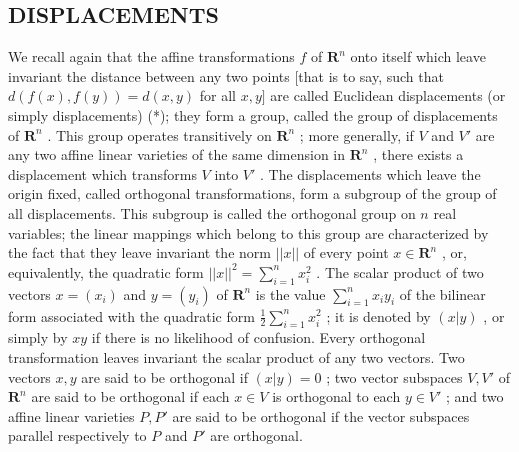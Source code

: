 \subsection{DISPLACEMENTS}

We recall again that the affine transformations \(f\) of \(\mathbf{R}^n\) onto itself which leave invariant the distance between any two points {[}that is to say, such that \(d(f(x), f(y)) = d(x, y)\) for all \(x, y]\) are called Euclidean displacements (or simply displacements) (*); they form a group, called the group of displacements of \(\mathbf{R}^n\) . This group operates transitively on \(\mathbf{R}^n\) ; more generally, if \(V\) and \(V'\) are any two affine linear varieties of the same dimension in \(\mathbf{R}^n\) , there exists a displacement which transforms \(V\) into \(V'\) . The displacements which leave the origin fixed, called orthogonal transformations, form a subgroup of the group of all displacements. This subgroup is called the orthogonal group on \(n\) real variables; the linear mappings which belong to this group are characterized by the fact that they leave invariant the norm \(||x||\) of every point \(x \in \mathbf{R}^n\) , or, equivalently, the quadratic form \(||x||^2 = \sum_{i=1}^{n} x_i^2\) . The scalar product of two vectors \(x = (x_i)\) and \(y = (y_i)\) of \(\mathbf{R}^n\) is the value \(\sum_{i=1}^{n} x_i y_i\) of the bilinear form associated with the quadratic form \(\frac{1}{2} \sum_{i=1}^{n} x_i^2\) ; it is denoted by \((x|y)\) , or simply by \(xy\) if there is no likelihood of confusion. Every orthogonal transformation leaves invariant the scalar product of any two vectors. Two vectors \(x, y\) are said to be orthogonal if \((x|y) = 0\) ; two vector subspaces \(V, V'\) of \(\mathbf{R}^n\) are said to be orthogonal if each \(x \in V\) is orthogonal to each \(y \in V'\) ; and two affine linear varieties \(P, P'\) are said to be orthogonal if the vector subspaces parallel respectively to \(P\) and \(P'\) are orthogonal.

